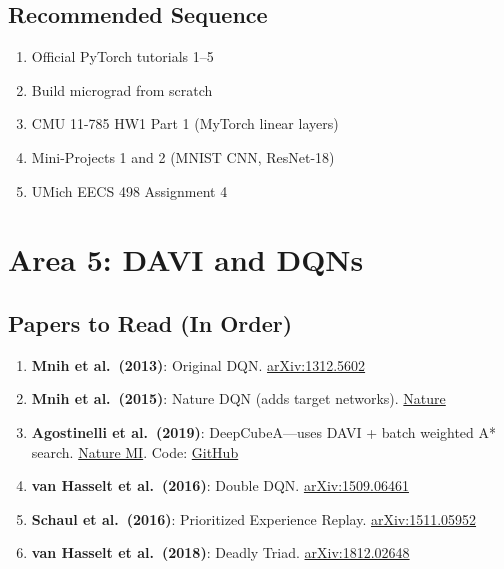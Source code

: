 \documentclass[11pt,letterpaper]{article}
\begin{document}
\subsection{Recommended Sequence}

\begin{enumerate}[nosep]
    \item Official PyTorch tutorials 1--5
    \item Build micrograd from scratch
    \item CMU 11-785 HW1 Part 1 (MyTorch linear layers)
    \item Mini-Projects 1 and 2 (MNIST CNN, ResNet-18)
    \item UMich EECS 498 Assignment 4
\end{enumerate}

\newpage
\section{Area 5: DAVI and DQNs}

\subsection{Papers to Read (In Order)}

\begin{enumerate}[nosep]
    \item \textbf{Mnih et al.\ (2013)}: Original DQN. \href{https://arxiv.org/abs/1312.5602}{arXiv:1312.5602}
    \item \textbf{Mnih et al.\ (2015)}: Nature DQN (adds target networks). \href{https://www.nature.com/articles/nature14236}{Nature}
    \item \textbf{Agostinelli et al.\ (2019)}: DeepCubeA---uses DAVI + batch weighted A* search. \href{https://www.nature.com/articles/s42256-019-0070-z}{Nature MI}. Code: \href{https://github.com/forestagostinelli/DeepCubeA}{GitHub}
    \item \textbf{van Hasselt et al.\ (2016)}: Double DQN. \href{https://arxiv.org/abs/1509.06461}{arXiv:1509.06461}
    \item \textbf{Schaul et al.\ (2016)}: Prioritized Experience Replay. \href{https://arxiv.org/abs/1511.05952}{arXiv:1511.05952}
    \item \textbf{van Hasselt et al.\ (2018)}: Deadly Triad. \href{https://arxiv.org/abs/1812.02648}{arXiv:1812.02648}
\end{enumerate}
\end{document}
